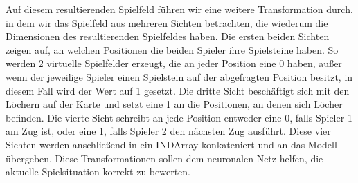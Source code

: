 \documentclass[12pt,a4paper]{article}
\begin{document}
Auf diesem resultierenden Spielfeld führen wir eine weitere Transformation durch, in dem wir das Spielfeld aus mehreren Sichten betrachten, die wiederum die Dimensionen des resultierenden Spielfeldes haben. Die ersten beiden Sichten zeigen auf, an welchen Positionen die beiden Spieler ihre Spielsteine haben. So werden 2 virtuelle Spielfelder erzeugt, die an jeder Position eine 0 haben, außer wenn der jeweilige Spieler einen Spielstein auf der abgefragten Position besitzt, in diesem Fall wird der Wert auf 1 gesetzt. Die dritte Sicht beschäftigt sich mit den Löchern auf der Karte und setzt eine 1 an die Positionen, an denen sich Löcher befinden. Die vierte Sicht schreibt an jede Position entweder eine 0, falls Spieler 1 am Zug ist, oder eine 1, falls Spieler 2 den nächsten Zug ausführt. Diese vier Sichten werden anschließend in ein INDArray konkateniert und an das Modell übergeben. Diese Transformationen sollen dem neuronalen Netz helfen, die aktuelle Spielsituation korrekt zu bewerten. \bigskip
\end{document}
